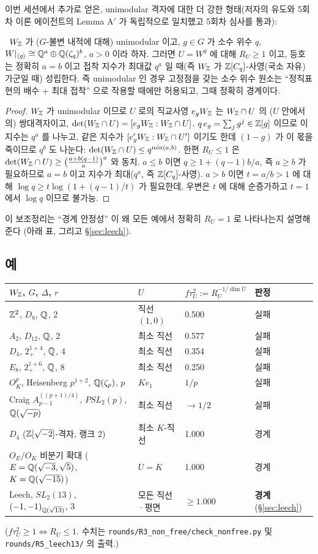 이번 세션에서 추가로 얻은, unimodular 격자에 대한 더 강한 형태(저자의 유도와 5회차 이론 에이전트의 Lemma A$'$ 가 독립적으로 일치했고 5회차 심사를 통과):
\begin{lemma}\label{lem:unimod}\tagP\
$W_{\mathbb{Z}}$ 가 ($G$-불변 내적에 대해) unimodular 이고, $g\in G$ 가 소수 위수 $q$, $W|_{\langle g\rangle}\cong\mathbb{Q}^a\oplus\mathbb{Q}(\zeta_q)^b$, $a>0$ 이라 하자. 그러면 $U=W^g$ 에 대해 $R_U\ge1$ 이고, 등호는 정확히 $a=b$ 이고 접착 지수가 최대값 $q^a$ 일 때(즉 $W_{\mathbb{Z}}$ 가 $\mathbb{Z}[C_q]$-사영(국소 자유)가군일 때) 성립한다. 즉 unimodular 인 경우 고정점을 갖는 소수 위수 원소는 ``정칙표현의 배수 + 최대 접착'' 으로 작용할 때에만 허용되고, 그때 정확히 경계이다.
\end{lemma}
\begin{proof}
$W_{\mathbb{Z}}$ 가 unimodular 이므로 $U$ 로의 직교사영 $e_gW_{\mathbb{Z}}$ 는 $W_{\mathbb{Z}}\cap U$ 의 ($U$ 안에서의) 쌍대격자이고, $\det(W_{\mathbb{Z}}\cap U)=[e_gW_{\mathbb{Z}}:W_{\mathbb{Z}}\cap U]$. $q\,e_g=\sum_jg^j\in\mathbb{Z}[g]$ 이므로 이 지수는 $q^{a}$ 를 나누고, 같은 지수가 $[e'_gW_{\mathbb{Z}}:W_{\mathbb{Z}}\cap U']$ 이기도 한데 $(1-g)$ 가 이 몫을 죽이므로 $q^{b}$ 도 나눈다: $\det(W_{\mathbb{Z}}\cap U)\le q^{\min(a,b)}$. 한편 $R_U\le1$ 은 $\det(W_{\mathbb{Z}}\cap U)\ge\big(\tfrac{a+b(q-1)}a\big)^a$ 와 동치. $a\le b$ 이면 $q\ge1+(q-1)b/a$, 즉 $a\ge b$ 가 필요하므로 $a=b$ 이고 지수가 최대($q^a$, 즉 $\mathbb{Z}[C_q]$-사영). $a>b$ 이면 $t=a/b>1$ 에 대해 $\log q\ge t\log(1+(q-1)/t)$ 가 필요한데, 우변은 $t$ 에 대해 순증가하고 $t=1$ 에서 $\log q$ 이므로 불가능.
\end{proof}
이 보조정리는 ``경계 안정성'' 이 왜 모든 예에서 정확히 $R_U=1$ 로 나타나는지 설명해 준다 (아래 표, 그리고 \S\ref{sec:leech}).

\subsection{예}
\begin{center}
\begin{tabular}{@{}llll@{}}
\toprule
$W_{\mathbb{Z}}$, $G$, $\Delta$, $r$ & $U$ & $f\tau_U^2:=R_U^{-1/\dim U}$ & 판정 \\
\midrule
$\mathbb{Z}^2$, $D_8$, $\mathbb{Q}$, 2 & 직선 $(1,0)$ & 0.500 & 실패 \\
$A_2$, $D_{12}$, $\mathbb{Q}$, 2 & 최소 직선 & 0.577 & 실패 \\
$D_4$, $2^{1+4}_+$, $\mathbb{Q}$, 4 & 최소 직선 & 0.354 & 실패 \\
$E_8$, $2^{1+6}_+$, $\mathbb{Q}$, 8 & 최소 직선 & 0.250 & 실패 \\
$O_K^p$, Heisenberg $p^{1+2}$, $\mathbb{Q}(\zeta_p)$, $p$ & $Ke_1$ & $1/p$ & 실패 \\
Craig $A_{p-1}^{((p+1)/4)}$, $PSL_2(p)$, $\mathbb{Q}(\sqrt{-p})$ & 최소 직선 & $\to 1/2$ & 실패 \\
$D_4$ ($\mathbb{Z}[\sqrt{-2}]$-격자, 랭크 2) & 최소 $K$-직선 & 1.000 & 경계 \\
$O_E/O_K$ 비분기 확대 ($E=\mathbb{Q}(\sqrt{-3},\sqrt5)$, $K=\mathbb{Q}(\sqrt{-15})$) & $U=K$ & 1.000 & 경계 \\
Leech, $SL_2(13)$, $(-1,-1)_{\mathbb{Q}(\sqrt{13})}$, 3 & 모든 직선·평면 & $\ge 1.000$ & \textbf{경계} (\S\ref{sec:leech}) \\
\bottomrule
\end{tabular}
\end{center}
($f\tau_U^2\ge1\iff R_U\le1$. 수치는 \texttt{rounds/R3\_non\_free/check\_nonfree.py} 및 \texttt{rounds/R5\_leech13/} 의 출력.)
